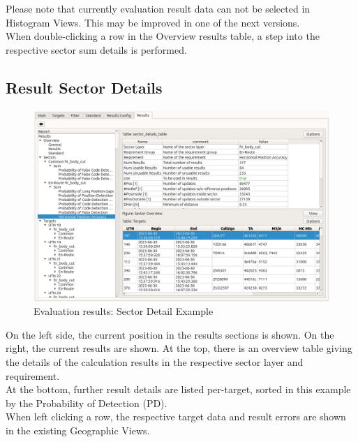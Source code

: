 Please note that currently evaluation result data can not be selected in Histogram Views. This may be improved in one of the next versions. \\

When double-clicking a row in the Overview results table, a step into the respective sector sum details is performed.

\subsection{Result Sector Details}

\begin{figure}[H]
  \hspace*{-2cm}
    \includegraphics[width=18cm,frame]{figures/eval_results_sec_det_example.png}
  \caption{Evaluation results: Sector Detail Example}
\end{figure}

On the left side, the current position in the results sections is shown. On the right, the current results are shown. At the top, there is an overview table giving the details of the calculation results in the respective sector layer and requirement. \\

At the bottom, further result details are listed per-target, sorted in this example by the Probability of Detection (PD). \\

When left clicking a row, the respective target data and result errors are shown in the existing Geographic Views.

